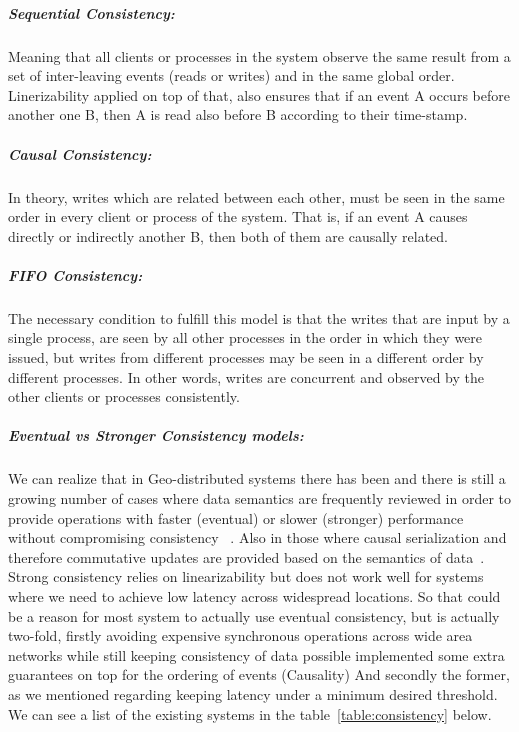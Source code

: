 		\subparagraph{Sequential Consistency:}
		Meaning that all clients or processes in the system observe the same result from a set of inter-leaving events (reads or writes) and in the same global order. Linerizability applied on top of that, also ensures that if an event A occurs before another one B, then A is read also before B according to their time-stamp.

		\subparagraph{Causal Consistency:}
		In theory, writes which are related between each other, must be seen in the same order in every client or process of the system. That is, if an event A causes directly or indirectly another B, then both of them are causally related.

		\subparagraph{FIFO Consistency:}
	The necessary condition to fulfill this model is that the writes that are input by a single process, are seen by all other processes in the order in which they were issued, but writes from different processes may be seen in a different order by different processes. In other words, writes are concurrent and observed by the other clients or processes consistently.
	
		\subparagraph{Eventual vs Stronger Consistency models:}
		We can realize that in Geo-distributed systems there has been and there is still a growing number of cases where data semantics are frequently reviewed in order to provide operations with faster (eventual) or slower (stronger) performance without compromising consistency ~\cite{Li:2012}. Also in those where causal serialization and therefore commutative updates are provided based on the semantics of data~\cite{Saphiro:2011}. Strong consistency relies on linearizability but does not work well for systems where we need to achieve low latency across widespread locations. So that could be a reason for most system to actually use eventual consistency, but is actually two-fold, firstly avoiding expensive synchronous operations across wide area networks while still keeping consistency of data possible implemented some extra guarantees on top for the ordering of events (Causality) And secondly the former, as we mentioned regarding keeping latency under a minimum desired threshold. We can see a list of the existing systems in the table~\ref{table:consistency} below.
		
